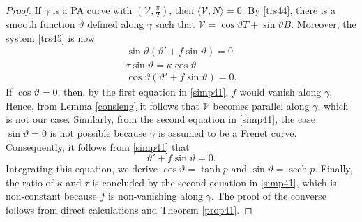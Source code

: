 \documentclass[10pt,a4paper]{amsart}
\DeclareMathOperator{\sech}{sech}
\def\v{\mathcal V}
\begin{document}
\begin{proof}
If $\gamma$ is a PA curve with $(\v,\frac{\pi}{2})$, then $\langle\v,N\rangle=0$. By \eqref{trs44}, there is a smooth function $\vartheta$ defined along $\gamma$ such that $\v=\cos \vartheta T+\sin\vartheta B$.
Moreover, the system \eqref{trs45} is now
\begin{equation}
\left. 
\begin{array}{r}
\sin\vartheta(\vartheta'+f\sin\vartheta)=0 \\ [4pt]
\tau\sin\vartheta=\kappa \cos\vartheta \\ [4pt]
\cos\vartheta\left(\vartheta'+f\sin\vartheta\right)=0.
\end{array}%
\right. \label{simp41}
\end{equation}
If $\cos\vartheta=0$, then, by the first equation in \eqref{simp41}, $f$ would vanish along $\gamma$. Hence, from Lemma \ref{consleng} it follows that $\v$ becomes parallel along $\gamma$, which is not our case. Similarly, from the second equation in \eqref{simp41}, the case $\sin\vartheta=0$ is not possible because  $\gamma$ is assumed to be a Frenet curve. Consequently, it follows from \eqref{simp41} that
$$
\vartheta'+f\sin\vartheta=0.
$$
Integrating this equation, we derive $\cos\vartheta=\tanh p$ and $ \sin\vartheta=\sech p.$ Finally, the ratio of $\kappa$ and $\tau$ is concluded by the second equation in \eqref{simp41}, which is non-constant because $f$ is non-vanishing along $\gamma$. The proof of the converse follows from direct calculations and Theorem \ref{prop41}.

\end{proof}
\end{document}
